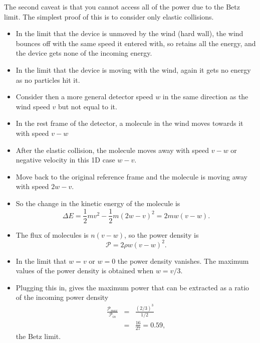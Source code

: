 \documentclass[11pt]{book}
\def\be{\begin{equation}}
\def\ee{\end{equation}}
\def\bea{\begin{eqnarray}}
\def\eea{\end{eqnarray}}
\newcommand{\vs}{\nonumber\\}
\newcommand\bei{\begin{itemize}}
\newcommand\eei{\end{itemize}}
\begin{document}
The second caveat is that you cannot access all of the power due to the Betz limit. The simplest proof of this is to consider only elastic collisions.
\bei
\item In the limit that the device is unmoved by the wind (hard wall), the wind bounces off with the same speed it entered with, so retains all the energy, and the device gets none of the incoming energy.
\item In the limit that the device is moving with the wind, again it gets no energy as no particles hit it.
\item Consider then a more general detector speed $w$ in the same direction as the wind speed $v$ but not equal to it.
\item In the rest frame of the detector, a molecule in the wind moves towards it with speed $v-w$
\item After the elastic collision, the molecule moves away with speed $v-w$ or negative velocity in this 1D case $w-v$.
\item Move back to the original reference frame and the molecule is moving away with speed $2w-v$.
\item So the change in the kinetic energy of the molecule is
\be
\Delta E = \frac12mv^2 - \frac12m(2w-v)^2=2mw(v-w).\ee
\item The flux of molecules is $n(v-w)$, so the power density is
\be
\mathcal{P} = 2\rho w(v-w)^2.\ee
\item In the limit that $w=v$ or $w=0$ the power density vanishes. The maximum values of the power density is obtained when $w=v/3$.
\item Plugging this in, gives the maximum power that can be extracted as a ratio of the incoming power density
\bea
\frac{\mathcal{P}_{max}}{\mathcal{P}_{in}} &=& \frac{(2/3)^3}{1/2}
\vs
&=&
\frac{16}{27}=0.59,
\eea
the Betz limit.
\eei
\end{document}
